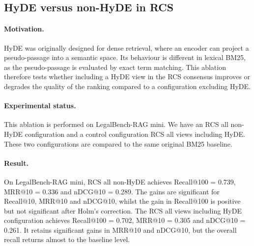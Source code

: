 \documentclass[a4paper,fleqn]{cas-dc}
\begin{document}
\subsection{HyDE versus non-HyDE in RCS}
\label{sec:ablation-hyde}
\paragraph{Motivation.}
HyDE was originally designed for dense retrieval,
where an encoder can project a pseudo-passage
into a semantic space. Its behaviour is
different in lexical BM25, as the pseudo-passage is
evaluated by exact term matching. This ablation
therefore tests whether including a HyDE view in the
RCS consensus improves or degrades the quality of
the ranking compared to a configuration excluding
HyDE.
\paragraph{Experimental status.}
This ablation is performed on LegalBench-RAG mini. We
have an RCS all non-HyDE configuration and a
control configuration RCS all views including HyDE.
These two configurations are compared to the same
original BM25 baseline.
\paragraph{Result.}
On LegalBench-RAG mini, RCS all non-HyDE achieves
Recall@100 = 0.739, MRR@10 = 0.336 and nDCG@10 = 0.289.
The gains are significant for Recall@10, MRR@10 and
nDCG@10, whilst the gain in Recall@100 is positive
but not significant after Holm’s correction. The
RCS all views including HyDE configuration achieves
Recall@100 = 0.702, MRR@10 = 0.305 and nDCG@10 = 0.261.
It retains significant gains in MRR@10 and
nDCG@10, but the overall recall returns almost to the
baseline level.
\begin{table}[h]
\centering
\caption{HyDE versus non-HyDE ablation in RCS on
LegalBench-RAG mini. $\dagger$: significant gain
after Holm correction. {--}: result not
significant.}
\label{tab:ablation-hyde}
\end{table}
\end{document}
